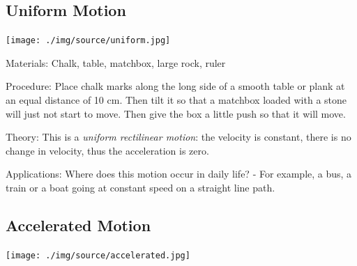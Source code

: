\begin{multicols}{2}
\subsection{Uniform Motion}

\begin{center}
\texttt{[image: ./img/source/uniform.jpg]}
\end{center}

\begin{description*}
\item[Materials:]{Chalk, table, matchbox, large rock, ruler}
\item[Procedure:]{Place chalk marks along the long side of a smooth table or plank at an equal distance of
10 cm. Then tilt it so that a matchbox loaded with a stone will just not start to move. Then give
the box a little push so that it will move.}
\item[Theory:]{This is a \emph{uniform rectilinear motion}: the velocity is constant, there is no change in
velocity, thus the acceleration is zero.}
\item[Applications:]{Where does this motion occur in daily life? - For example, a bus, a train or a boat going at
constant speed on a straight line path.}
\end{description*}

\columnbreak

\subsection{Accelerated Motion}

\begin{center}
\texttt{[image: ./img/source/accelerated.jpg]}
\end{center}


\end{multicols}

